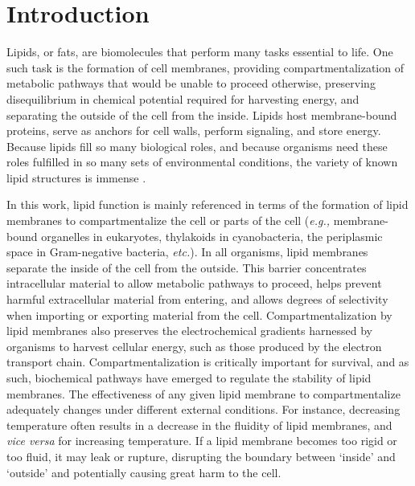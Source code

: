 \chapter[INTRODUCTION]{Introduction}\label{ch_intro}


Lipids, or fats, are biomolecules that perform many tasks essential to life. One such task is the formation of cell membranes, providing compartmentalization of metabolic pathways that would be unable to proceed otherwise, preserving disequilibrium in chemical potential required for harvesting energy, and separating the outside of the cell from the inside. Lipids host membrane-bound proteins, serve as anchors for cell walls, perform signaling, and store energy. Because lipids fill so many biological roles, and because organisms need these roles fulfilled in so many sets of environmental conditions, the variety of known lipid structures is immense \citep[\textit{e.g.,}][]{Sturt_Intact_2004, belin2018hopanoid, van2008membrane, Yoshinaga_Systematic_2011, schouten2013organic}.

In this work, lipid function is mainly referenced in terms of the formation of lipid membranes to compartmentalize the cell or parts of the cell (\textit{e.g.,} membrane-bound organelles in eukaryotes, thylakoids in cyanobacteria, the periplasmic space in Gram-negative bacteria, \textit{etc.}). In all organisms, lipid membranes separate the inside of the cell from the outside. This barrier concentrates intracellular material to allow metabolic pathways to proceed, helps prevent harmful extracellular material from entering, and allows degrees of selectivity when importing or exporting material from the cell. Compartmentalization by lipid membranes also preserves the electrochemical gradients harnessed by organisms to harvest cellular energy, such as those produced by the electron transport chain. Compartmentalization is critically important for survival, and as such, biochemical pathways have emerged to regulate the stability of lipid membranes. The effectiveness of any given lipid membrane to compartmentalize adequately changes under different external conditions. For instance, decreasing temperature often results in a decrease in the fluidity of lipid membranes, and \textit{vice versa} for increasing temperature. If a lipid membrane becomes too rigid or too fluid, it may leak or rupture, disrupting the boundary between `inside' and `outside' and potentially causing great harm to the cell. %

